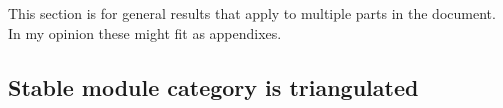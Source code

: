 This section is for general results that apply to multiple parts in the document. In my opinion these might fit as appendixes.

\subsection{Stable module category is triangulated}

